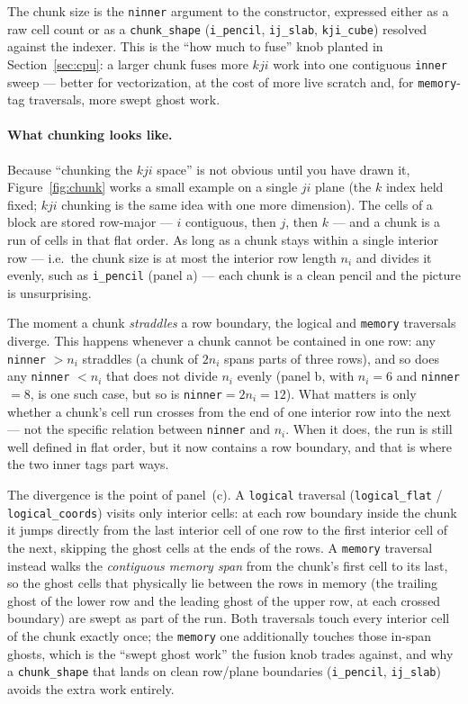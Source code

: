 \documentclass[11pt]{article}
\newcommand{\code}[1]{\lstinline[basicstyle=\ttfamily]|#1|}
\begin{document}
The chunk size is the \code{ninner} argument to the constructor, expressed either
as a raw cell count or as a \code{chunk_shape} (\code{i_pencil}, \code{ij_slab},
\code{kji_cube}) resolved against the indexer. This is the ``how much to fuse''
knob planted in Section~\ref{sec:cpu}: a larger chunk fuses more $kji$ work into
one contiguous \code{inner} sweep --- better for vectorization, at the cost of
more live scratch and, for \code{memory}-tag traversals, more swept ghost work.

\paragraph{What chunking looks like.} Because ``chunking the $kji$ space'' is not
obvious until you have drawn it, Figure~\ref{fig:chunk} works a small example on a
single $ji$ plane (the $k$ index held fixed; $kji$ chunking is the same idea with
one more dimension). The cells of a block are stored row-major --- $i$ contiguous,
then $j$, then $k$ --- and a chunk is a run of cells in that flat order. As long
as a chunk stays within a single interior row --- i.e.\ the chunk size is at most
the interior row length $n_i$ and divides it evenly, such as \code{i_pencil}
(panel a) --- each chunk is a clean pencil and the picture is unsurprising.

The moment a chunk \emph{straddles} a row boundary, the logical and \code{memory}
traversals diverge. This happens whenever a chunk cannot be contained in one row:
any \code{ninner} $> n_i$ straddles (a chunk of $2 n_i$ spans parts of three rows),
and so does any \code{ninner} $< n_i$ that does not divide $n_i$ evenly (panel b,
with $n_i = 6$ and \code{ninner}${}= 8$, is one such case, but so is
\code{ninner}${}= 2 n_i = 12$). What matters is only whether a chunk's cell run
crosses from the end of one interior row into the next --- not the specific
relation between \code{ninner} and $n_i$. When it does, the run is still well
defined in flat order, but it now contains a row boundary, and that is where the
two inner tags part ways.

The divergence is the point of panel~(c). A \code{logical} traversal
(\code{logical_flat} / \code{logical_coords}) visits only interior cells: at each
row boundary inside the chunk it jumps directly from the last interior cell of one
row to the first interior cell of the next, skipping the ghost cells at the ends of
the rows. A \code{memory} traversal instead walks the \emph{contiguous memory
span} from the chunk's first cell to its last, so the ghost cells that physically
lie between the rows in memory (the trailing ghost of the lower row and the
leading ghost of the upper row, at each crossed boundary) are swept as part of the
run. Both traversals touch every interior cell of the chunk exactly once; the
\code{memory} one additionally touches those in-span ghosts, which is the ``swept
ghost work'' the fusion knob trades against, and why a \code{chunk_shape} that
lands on clean row/plane boundaries (\code{i_pencil}, \code{ij_slab}) avoids the
extra work entirely.
\end{document}
